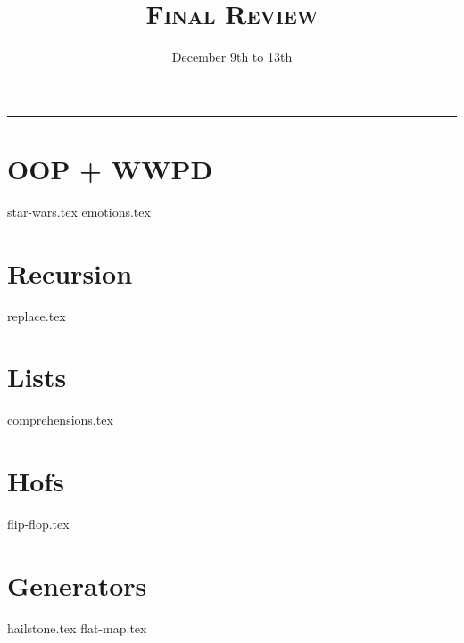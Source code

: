 \documentclass{exam}
\title{\textsc{Final Review}}
\date{December 9th to 13th}
\begin{document}
\maketitle
\rule{\textwidth}{0.15em}
\fontsize{12}{15}\selectfont


\begin{questions}

\section{OOP + WWPD}
{star-wars.tex}
\newpage
{emotions.tex}
\newpage
\section{Recursion}
{replace.tex}
\newpage
\section{Lists}
{comprehensions.tex}
\newpage
\section{Hofs}
{flip-flop.tex}

\newpage
\section{Generators}
{hailstone.tex}
{flat-map.tex}



\end{questions}
\end{document}

